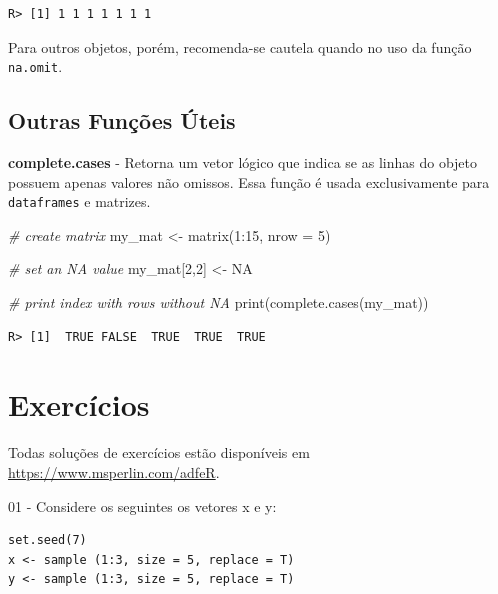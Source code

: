 \documentclass[
  11pt,
]{book}
\newenvironment{Shaded}{\begin{snugshade}}{\end{snugshade}}
\newcommand{\AttributeTok}[1]{\textcolor[rgb]{0.61,0.61,0.61}{#1}}
\newcommand{\CommentTok}[1]{\textcolor[rgb]{0.37,0.37,0.37}{\textit{#1}}}
\newcommand{\ConstantTok}[1]{\textcolor[rgb]{0,0,0}{#1}}
\newcommand{\DecValTok}[1]{\textcolor[rgb]{0.06,0.06,0.06}{#1}}
\newcommand{\FunctionTok}[1]{\textcolor[rgb]{0,0,0}{#1}}
\newcommand{\NormalTok}[1]{#1}
\newcommand{\OtherTok}[1]{\textcolor[rgb]{0.37,0.37,0.37}{#1}}
\newcommand{\SpecialCharTok}[1]{\textcolor[rgb]{0,0,0}{#1}}
\begin{document}
\begin{verbatim}
R> [1] 1 1 1 1 1 1 1
\end{verbatim}

Para outros objetos, porém, recomenda-se cautela quando no uso da função \texttt{na.omit}.

\hypertarget{outras-funuxe7uxf5es-uxfateis-6}{%
\subsection{Outras Funções Úteis}\label{outras-funuxe7uxf5es-uxfateis-6}}

\textbf{complete.cases} - Retorna um vetor lógico que indica se as linhas do objeto possuem apenas valores não omissos. Essa função é usada exclusivamente para \texttt{dataframes} e matrizes.

\begin{Shaded}
\begin{Highlighting}[]
\CommentTok{\# create matrix}
\NormalTok{my\_mat }\OtherTok{\textless{}{-}} \FunctionTok{matrix}\NormalTok{(}\DecValTok{1}\SpecialCharTok{:}\DecValTok{15}\NormalTok{, }\AttributeTok{nrow =} \DecValTok{5}\NormalTok{)}

\CommentTok{\# set an NA value}
\NormalTok{my\_mat[}\DecValTok{2}\NormalTok{,}\DecValTok{2}\NormalTok{] }\OtherTok{\textless{}{-}} \ConstantTok{NA}

\CommentTok{\# print index with rows without NA}
\FunctionTok{print}\NormalTok{(}\FunctionTok{complete.cases}\NormalTok{(my\_mat))}
\end{Highlighting}
\end{Shaded}

\begin{verbatim}
R> [1]  TRUE FALSE  TRUE  TRUE  TRUE
\end{verbatim}

\hypertarget{exerc-classes-basicas}{%
\section{Exercícios}\label{exerc-classes-basicas}}

Todas soluções de exercícios estão disponíveis em \url{https://www.msperlin.com/adfeR}.

01 -
Considere os seguintes os vetores x e y:

\begin{verbatim}
set.seed(7)
x <- sample (1:3, size = 5, replace = T)
y <- sample (1:3, size = 5, replace = T)
\end{verbatim}
\end{document}
